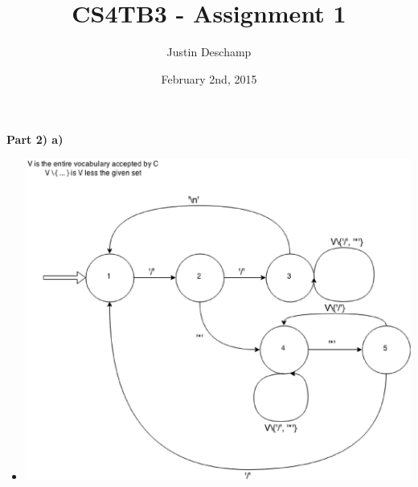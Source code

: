 \documentclass[12pt]{article}
\title{CS4TB3 - Assignment 1}
\author{Justin Deschamp}
\date{February 2nd, 2015}
\begin{document}
\maketitle

\textbf{Part 2) a)}
\begin{itemize}
    \item[]
        \includegraphics[scale=0.65]{graph}
\end{itemize}
\end{document}
